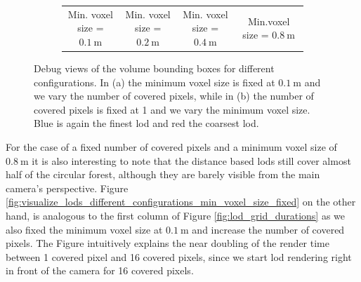 \begin{figure}
\begin{subfigure}[b]{\linewidth}
\begin{center}
\begin{tabular}{ c c c c  }
                {\footnotesize Min. voxel size = $\SI{0.1}{\m}$} & {\footnotesize Min. voxel size = $\SI{0.2}{\m}$} & {\footnotesize Min. voxel size = $\SI{0.4}{\m}$} & {\footnotesize Min.\newline voxel size = $\SI{0.8}{\m}$}\\
            \end{tabular}
        \end{center}
        \caption{}
        \label{fig:visualize_lods_different_configurations_covered_pixels_fixed}
    \end{subfigure}
    \caption[Visualization of \acsp{lod} using different configurations]{Debug views of the volume bounding boxes for different configurations. In (a) the minimum voxel size is fixed at $\SI{0.1}{\m}$ and we vary the number of covered pixels, while in (b) the number of covered pixels is fixed at 1 and we vary the minimum voxel size. Blue is again the finest \ac{lod} and red the coarsest \ac{lod}. }
    \label{fig:visualize_lods_different_configurations}
\end{figure}
For the case of a fixed number of covered pixels and a minimum voxel size of $\SI{0.8}{\m}$ it is also interesting to note that the distance based \acsp{lod} still cover almost half of the circular forest, although they are barely visible from the main camera's perspective.
Figure \ref{fig:visualize_lods_different_configurations_min_voxel_size_fixed} on the other hand, is analogous to the first column of Figure \ref{fig:lod_grid_durations} as we also fixed the minimum voxel size at $\SI{0.1}{\m}$ and increase the number of covered pixels.
The Figure intuitively explains the near doubling of the render time between 1 covered pixel and 16 covered pixels, since we start \ac{lod} rendering right in front of the camera for 16 covered pixels.


